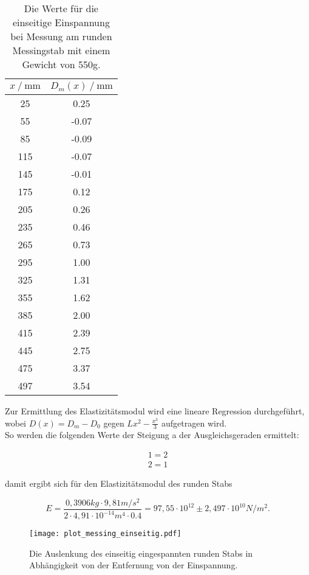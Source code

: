 \begin{table}[H]
  \centering
  \caption{Die Werte für die einseitige Einspannung bei Messung am runden Messingstab mit einem Gewicht von 550g.}
  \begin{tabular}{cc}
    \toprule
    {$x \mathbin{/} \unit{\milli\metre}$} &
    {$D_m(x) \mathbin{/} \unit{\milli\metre}$} \\
    \midrule
     25 &  0.25 \\
     55 & -0.07 \\
     85 & -0.09 \\
    115 & -0.07 \\
    145 & -0.01 \\
    175 & 0.12 \\
    205 & 0.26 \\ 
    235 & 0.46 \\
    265 & 0.73 \\
    295 & 1.00 \\
    325 & 1.31 \\
    355 & 1.62 \\
    385 & 2.00 \\
    415 & 2.39 \\
    445 & 2.75 \\
    475 & 3.37 \\
    497 & 3.54 \\
    
    \bottomrule
  \end{tabular}
  \label{tab:Tabelle2}
\end{table}

Zur Ermittlung des Elastizitätsmodul wird eine lineare Regression durchgeführt, wobei $D(x) = D_m - D_0$ gegen 
$Lx^2 - \frac{x^3}{3}$ aufgetragen wird.\\
So werden die folgenden Werte der Steigung a der Ausgleichsgeraden ermittelt:

\begin{align*} %
  1 = 2 \\
  2 = 1
\end{align*}

damit ergibt sich für den Elastizitätsmodul des runden Stabs

\begin{equation*}
  E = \frac{0,3906kg \cdot 9,81m/s^2}{2 \cdot 4,91\cdot 10^{-14} m^4 \cdot 0.4} = 97,55 \cdot 10^{12} \pm 2,497 \cdot 10^{10} N/m^2.
\end{equation*}


\begin{figure}
  \centering
  \texttt{[image: plot\_messing\_einseitig.pdf]}
  \caption{Die Auslenkung des einseitig eingespannten runden Stabs in Abhängigkeit 
  von der Entfernung von der Einspannung.}
  \label{fig:plot_messing_einseitig}
\end{figure}

